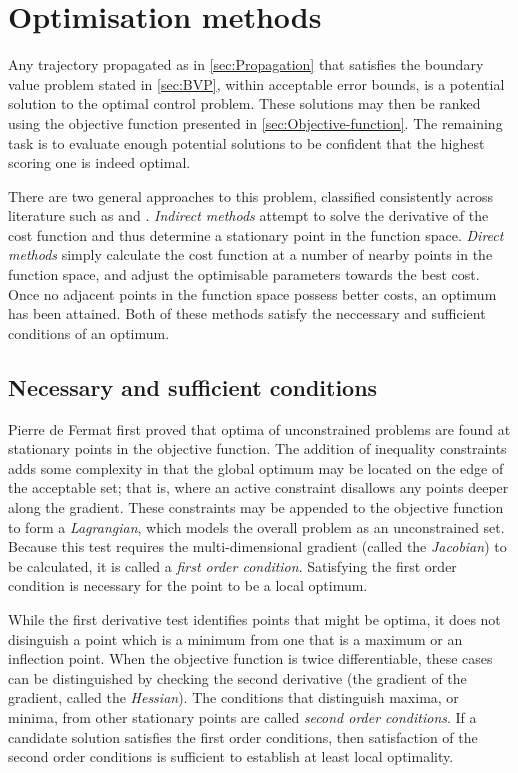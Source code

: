 \section{Optimisation methods} \label{sec:Optimisation}

Any trajectory propagated as in \autoref{sec:Propagation} that satisfies the boundary value problem stated in \autoref{sec:BVP}, within acceptable error bounds, is a potential solution to the optimal control problem. These solutions may then be ranked using the objective function presented in \autoref{sec:Objective-function}. The remaining task is to evaluate enough potential solutions to be confident that the highest scoring one is indeed optimal. 

There are two general approaches to this problem, classified consistently across literature such as \textcite{Betts1998} and \textcite{ASTOS_guide}. \emph{Indirect methods} attempt to solve the derivative of the cost function and thus determine a stationary point in the function space. \emph{Direct methods} simply calculate the cost function at a number of nearby points in the function space, and adjust the optimisable parameters towards the best cost. Once no adjacent points in the function space possess better costs, an optimum has been attained. Both of these methods satisfy the neccessary and sufficient conditions of an optimum. 

\subsection{Necessary and sufficient conditions} \label{sub:Neccessary-and-sufficient}

Pierre de Fermat first proved that optima of unconstrained problems are found at stationary points in the objective function. The addition of inequality constraints adds some complexity in that the global optimum may be located on the edge of the acceptable set; that is, where an active constraint disallows any points deeper along the gradient. These constraints may be appended to the objective function to form a \emph{Lagrangian}, which models the overall problem as an unconstrained set. Because this test requires the multi-dimensional gradient (called the \emph{Jacobian}) to be calculated, it is called a \emph{first order condition}. Satisfying the first order condition is necessary for the point to be a local optimum.

While the first derivative test identifies points that might be optima, it does not disinguish a point which is a minimum from one that is a maximum or an inflection point. When the objective function is twice differentiable, these cases can be distinguished by checking the second derivative (the gradient of the gradient, called the \emph{Hessian}). The conditions that distinguish maxima, or minima, from other stationary points are called \emph{second order conditions}. If a candidate solution satisfies the first order conditions, then satisfaction of the second order conditions is sufficient to establish at least local optimality.

